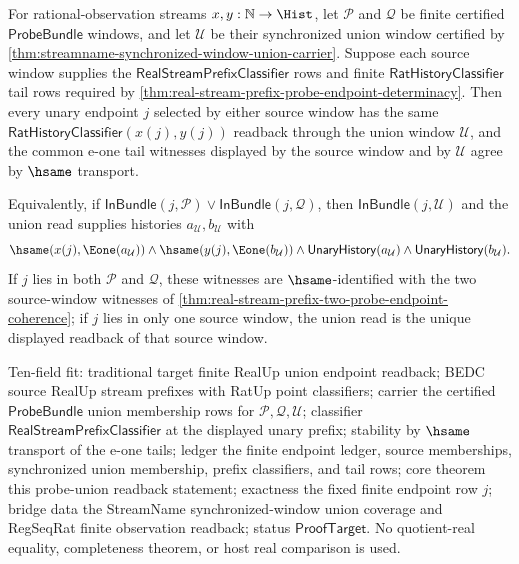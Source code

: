 \begin{theorem}
\label{thm:real-stream-prefix-probe-union-endpoint-readback}
For rational-observation streams $x,y:\mathbb{N}\to\Hist$, let
$\mathcal P$ and $\mathcal Q$ be finite certified $\mathsf{ProbeBundle}$
windows, and let $\mathcal U$ be their synchronized union window certified by
\autoref{thm:streamname-synchronized-window-union-carrier}. Suppose each source
window supplies the $\mathsf{RealStreamPrefixClassifier}$ rows and finite
$\mathsf{RatHistoryClassifier}$ tail rows required by
\autoref{thm:real-stream-prefix-probe-endpoint-determinacy}. Then every unary
endpoint $j$ selected by either source window has the same
$\mathsf{RatHistoryClassifier}(x(j),y(j))$ readback through the union window
$\mathcal U$, and the common e-one tail witnesses displayed by the source
window and by $\mathcal U$ agree by $\hsame$ transport.

Equivalently, if
$\mathsf{InBundle}(j,\mathcal P)\lor\mathsf{InBundle}(j,\mathcal Q)$, then
$\mathsf{InBundle}(j,\mathcal U)$ and the union read supplies histories
$a_{\mathcal U},b_{\mathcal U}$ with
$$
\hsame(x(j),\Eone(a_{\mathcal U}))\land
\hsame(y(j),\Eone(b_{\mathcal U}))\land
\mathsf{UnaryHistory}(a_{\mathcal U})\land
\mathsf{UnaryHistory}(b_{\mathcal U}).
$$
If $j$ lies in both $\mathcal P$ and $\mathcal Q$, these witnesses are
$\hsame$-identified with the two source-window witnesses of
\autoref{thm:real-stream-prefix-two-probe-endpoint-coherence}; if $j$ lies in
only one source window, the union read is the unique displayed readback of that
source window.

Ten-field fit: traditional target finite RealUp union endpoint readback; BEDC
source RealUp stream prefixes with RatUp point classifiers; carrier the
certified $\mathsf{ProbeBundle}$ union membership rows for
$\mathcal P,\mathcal Q,\mathcal U$; classifier
$\mathsf{RealStreamPrefixClassifier}$ at the displayed unary prefix; stability
by $\hsame$ transport of the e-one tails; ledger the finite endpoint ledger,
source memberships, synchronized union membership, prefix classifiers, and
tail rows; core theorem this probe-union readback statement; exactness the
fixed finite endpoint row $j$; bridge data the StreamName synchronized-window
union coverage and RegSeqRat finite observation readback; status
$\mathsf{ProofTarget}$. No quotient-real equality, completeness theorem, or
host real comparison is used.
\end{theorem}
